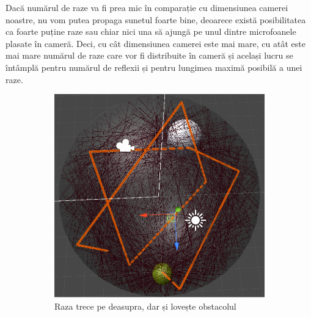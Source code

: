 	Dacă numărul de raze va fi prea mic în comparație cu dimensiunea camerei noastre, nu vom putea propaga sunetul foarte bine, deoarece există posibilitatea ca foarte puține raze sau chiar nici una să ajungă pe unul dintre microfoanele plasate în cameră. Deci, cu cât dimensiunea camerei este mai mare, cu atât este mai mare numărul de raze care vor fi distribuite în cameră și același lucru se întâmplă pentru numărul de reflexii și pentru lungimea maximă posibilă a unei raze.
	
	\begin{figure}[!htb]%
		\begin{subfigure}[b]{.3\textwidth}
			\centering
			\includegraphics[width=1\linewidth]{imagini/m1r22-5000.png} 
			\caption{Raza trece pe deasupra, dar și lovește obstacolul}
		\end{subfigure}
		\hfill
		\begin{subfigure}[b]{.3\textwidth}
			\centering

\end{subfigure}
\end{figure}
